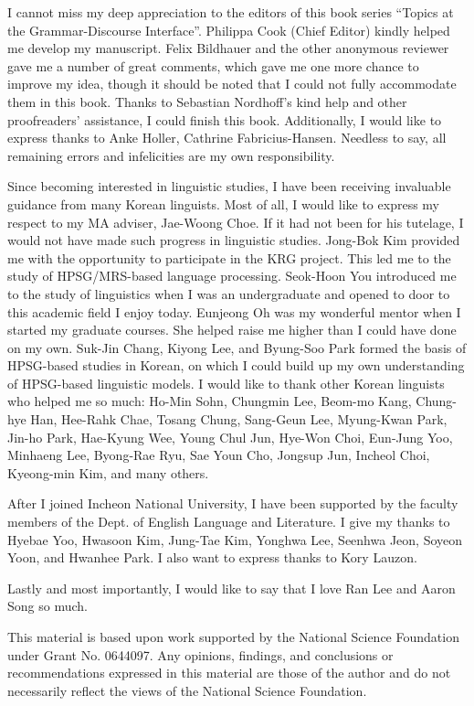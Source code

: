 I cannot miss my deep appreciation to the editors of this book series
``Topics at the Grammar-Discourse Interface''. Philippa Cook (Chief
Editor) kindly helped me develop my manuscript.  Felix Bildhauer and
the other anonymous reviewer gave me a number of great comments, which
gave me one more chance to improve my idea, though it should be noted
that I could not fully accommodate them in this book.  Thanks to
Sebastian Nordhoff's kind help and other proofreaders' assistance, I
could finish this book.  Additionally, I would like to express thanks
to Anke Holler, Cathrine Fabricius-Hansen. Needless to say, all
remaining errors and infelicities are my own responsibility.



Since becoming interested in linguistic studies, I have been receiving
invaluable guidance from many Korean linguists. Most of all, I would
like to express my respect to my MA adviser, Jae-Woong Choe. If it had
not been for his tutelage, I would not have made such progress in
linguistic studies. Jong-Bok Kim provided me with the opportunity to
participate in the KRG project. This led me to the study of
HPSG/MRS-based language processing. Seok-Hoon You introduced me to the
study of linguistics when I was an undergraduate and opened to door to
this academic field I enjoy today. Eunjeong Oh was my wonderful mentor
when I started my graduate courses. She helped raise me higher than I
could have done on my own. Suk-Jin Chang, Kiyong Lee, and Byung-Soo
Park formed the basis of HPSG-based studies in Korean, on which I
could build up my own understanding of HPSG-based linguistic models. I
would like to thank other Korean linguists who helped me so much:
Ho-Min Sohn, Chungmin Lee, Beom-mo Kang, Chung-hye Han, Hee-Rahk Chae,
Tosang Chung, Sang-Geun Lee, Myung-Kwan Park, Jin-ho Park, Hae-Kyung
Wee, Young Chul Jun, Hye-Won Choi, Eun-Jung Yoo, Minhaeng Lee,
Byong-Rae Ryu, Sae Youn Cho, Jongsup Jun, Incheol Choi, Kyeong-min
Kim, and many others.



After I joined Incheon National University, I have been supported by
the faculty members of the Dept. of English Language and Literature. I
give my thanks to Hyebae Yoo, Hwasoon Kim, Jung-Tae Kim, Yonghwa Lee,
Seenhwa Jeon, Soyeon Yoon, and Hwanhee Park. I also want to express
thanks to Kory Lauzon.




Lastly and most importantly, I would like to say that I love Ran Lee
and Aaron Song so much.


This material is based upon work supported by the National Science
Foundation under Grant No. 0644097. Any opinions, findings, and
conclusions or recommendations expressed in this material are those of
the author and do not necessarily reflect the views of the National
Science Foundation.

 